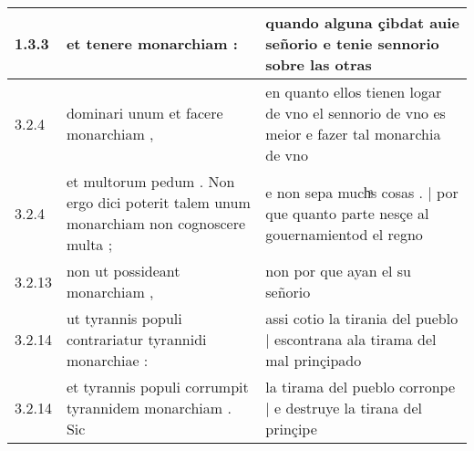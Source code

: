 \begin{tabular}{|p{1cm}|p{6.5cm}|p{6.5cm}|}

\hline
1.3.3 & et tenere monarchiam : & quando alguna çibdat auie señorio e tenie sennorio sobre las otras \\\hline
3.2.4 & dominari unum et facere monarchiam , & en quanto ellos tienen logar de vno el sennorio de vno es meior e fazer tal monarchia de vno \\\hline
3.2.4 & et multorum pedum . Non ergo dici poterit talem unum monarchiam non cognoscere multa ; & e non sepa muchͣs cosas . | por que quanto parte nesçe al gouernamientod el regno \\\hline
3.2.13 & non ut possideant monarchiam , & non por que ayan el su señorio \\\hline
3.2.14 & ut tyrannis populi contrariatur tyrannidi monarchiae : & assi cotio la tirania del pueblo | escontrana ala tirama del mal prinçipado \\\hline
3.2.14 & et tyrannis populi corrumpit tyrannidem monarchiam . Sic & la tirama del pueblo corronpe | e destruye la tirana del prinçipe \\\hline

\end{tabular}
